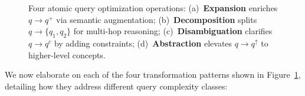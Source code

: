 \documentclass{article}
\begin{document}
\begin{figure}[t]
\caption{Four atomic query optimization operations: (a)~\textbf{Expansion} enriches $q \to q^+$ via semantic augmentation; (b)~\textbf{Decomposition} splits $q \to \{q_1, q_2\}$ for multi-hop reasoning; (c)~\textbf{Disambiguation} clarifies $q \to q^c$ by adding constraints; (d)~\textbf{Abstraction} elevates $q \to q^\uparrow$ to higher-level concepts.}
\label{fig:qo_planner}
\end{figure}

We now elaborate on each of the four transformation patterns shown in Figure~\ref{fig:qo_planner}, detailing how they address different query complexity classes:
\end{document}

